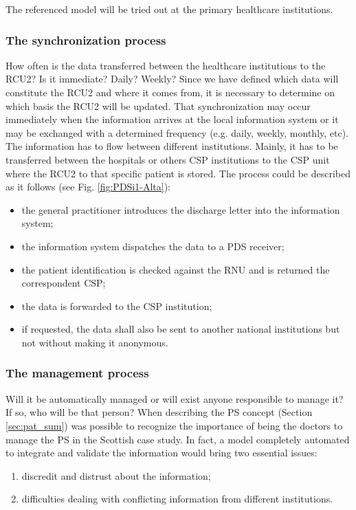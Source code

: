 The referenced model will be tried out at the primary healthcare institutions.


\subsubsection{The synchronization process}

How often is the data transferred between the healthcare institutions to the RCU2? Is it immediate? Daily? Weekly? Since we have defined which data will constitute the RCU2 and where it comes from, it is necessary to determine on which basis the RCU2 will be updated. That synchronization may occur immediately when the information arrives at the local information system or it may be exchanged with a determined frequency (e.g. daily, weekly, monthly, etc).
The information has to flow between different institutions. Mainly, it has to be transferred between the hospitals or others CSP institutions to the CSP unit where the RCU2 to that specific patient is stored. The process could be described as it follows (see Fig. \ref{fig:PDSi1-Alta}):

\begin{itemize}
\item the general practitioner introduces the discharge letter into the information system;
\item the information system dispatches the data to a PDS receiver;
\item the patient identification is checked against the RNU and is returned the correspondent CSP;
\item the data is forwarded to the CSP institution;
\item if requested, the data shall also be sent to another national institutions but not without making it anonymous.
\end{itemize}



\subsubsection{The management process}

Will it be automatically managed or will exist anyone responsible to manage it? If so, who will be that person? When describing the PS concept (Section \ref{sec:pat_sum}) was possible to recognize the importance of being the doctors to manage the PS in the Scottish case study. In fact, a model completely automated to integrate and validate the information would bring two essential issues:
\begin{enumerate}
\item discredit and distrust about the information;
\item difficulties dealing with conflicting information from different institutions.
\end{enumerate}

